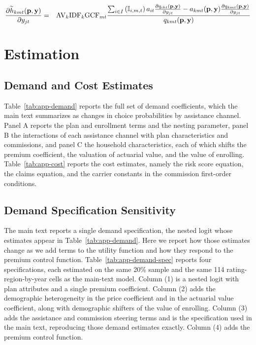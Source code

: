 \documentclass[12pt]{article}
\begin{document}
	\vspace{-0.3in}
	
	\begin{eqnarray*}
		\frac{\partial \widetilde{h}_{kmt}({\bf p},{\bf y})}{\partial y_{jt}} &=& \mathrm{AV}_k \mathrm{IDF}_k\mathrm{GCF}_{mt} \frac{\sum_{i \in I} \left(\mathbb{I}_{i,m,t} \right) a_{it} \frac{ \partial q_{ikt}({\bf p},{\bf y})}{\partial y_{jt}} - a_{kmt}({\bf p},{\bf y}) \frac{\partial q_{kmt}({\bf p},{\bf y})}{\partial y_{jt}}}{q_{kmt}({\bf p},{\bf y})}
	\end{eqnarray*}


\section{Estimation}
\label{app:estimation}

\subsection{Demand and Cost Estimates}
\label{app:estimates}

Table~\ref{tab:app-demand} reports the full set of demand coefficients, which the main text summarizes as changes in choice probabilities by assistance channel. Panel A reports the plan and enrollment terms and the nesting parameter, panel B the interactions of each assistance channel with plan characteristics and commissions, and panel C the household characteristics, each of which shifts the premium coefficient, the valuation of actuarial value, and the value of enrolling. Table~\ref{tab:app-cost} reports the cost estimates, namely the risk score equation, the claims equation, and the carrier constants in the commission first-order conditions.

\subsection{Demand Specification Sensitivity}
\label{app:demand-spec}

The main text reports a single demand specification, the nested logit whose estimates appear in Table~\ref{tab:app-demand}. Here we report how those estimates change as we add terms to the utility function and how they respond to the premium control function. Table~\ref{tab:app-demand-spec} reports four specifications, each estimated on the same 20\% sample and the same 114 rating-region-by-year cells as the main-text model. Column (1) is a nested logit with plan attributes and a single premium coefficient. Column (2) adds the demographic heterogeneity in the price coefficient and in the actuarial value coefficient, along with demographic shifters of the value of enrolling. Column (3) adds the assistance and commission steering terms and is the specification used in the main text, reproducing those demand estimates exactly. Column (4) adds the premium control function.
\end{document}
